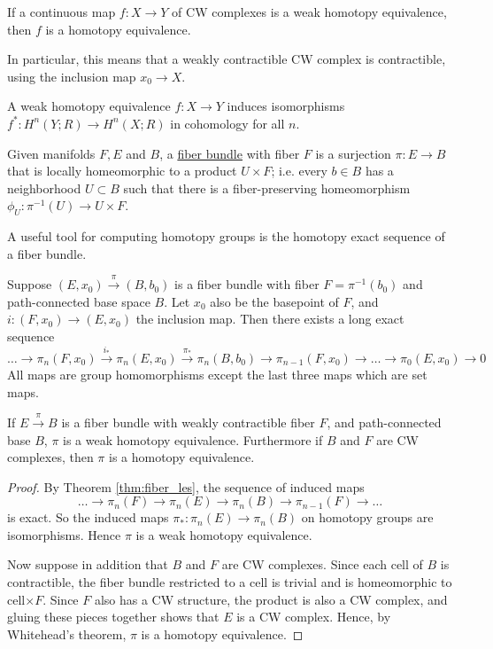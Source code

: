 \begin{thm} 
	If a continuous map $f:X\to Y$ of CW complexes 
	is a weak homotopy equivalence, then  $f$ is a homotopy equivalence. 
\end{thm}
In particular, this
means that a weakly contractible CW complex is contractible, using the inclusion
map $x_0 \to X$. 

\begin{thm} \label{thm:weak_to_cohomology}
	A weak homotopy equivalence $f:X\to Y$ induces isomorphisms
	$f^*:H^n(Y;R)\to H^n(X;R)$ in cohomology for all  $n$.
\end{thm}
\begin{defn}
	Given manifolds $F,E$ and $B$, 
	a \underline{fiber bundle} with fiber $F$ is a surjection  $\pi: E\to B$
	that is locally homeomorphic to a product $U\times F$; i.e. every  $b\in B$
	has a neighborhood  $U\subset B$ such that there is a fiber-preserving
	homeomorphism $\phi_U : \pi^{-1}(U) \to U\times F$.
\end{defn}
A useful tool for computing homotopy groups is the homotopy exact sequence of a
fiber bundle. 
\begin{thm} \label{thm:fiber_les}
	Suppose $(E,x_0) \xrightarrow{\pi} (B,b_0)$ is a fiber bundle with fiber
	$F=\pi^{-1}(b_0)$ and path-connected base space $B$. Let  $x_0$ also be the
	basepoint of $F$, and  $i:(F,x_0)\to (E,x_0)$ the inclusion map. Then there
	exists a long exact sequence
	\[
		\ldots\to\pi_n(F,x_0) \xrightarrow{i_*}\pi_n(E,x_0)
		\xrightarrow{\pi_*}\pi_n(B,b_0)
		\to \pi_{n-1}(F,x_0)\to\ldots\to\pi_0(E,x_0)\to 0
	\] 
	All maps are group homomorphisms except the last three maps which are set
	maps.
\end{thm}

\begin{prop} \label{prop:total_base_iso}
	If $E \xrightarrow{\pi} B$ is a fiber bundle with weakly contractible fiber $F$,
	and path-connected base $B$, $\pi$ is a weak homotopy equivalence.
	Furthermore if $B$ and $F$ are CW complexes, 
	then $\pi$ is a homotopy equivalence.  
\end{prop}
\begin{proof}
	By Theorem \ref{thm:fiber_les}, the sequence of induced maps
	\[
	\ldots \to \pi_n(F) \to \pi_n(E) \to\pi_n(B) \to
	\pi_{n-1}(F)\to \ldots
	\] 
	is exact. So the induced maps $\pi_* : \pi_n(E) \to
	\pi_n(B)$ on homotopy groups are isomorphisms. Hence $\pi$ is a weak
	homotopy equivalence. 

	Now suppose in addition that $B$ and $F$ are CW complexes. 
	Since each cell of $B$ is contractible, the fiber bundle
	restricted to a cell is trivial and is homeomorphic to  cell$\times F$. 
	Since  $F$ also has a CW structure, the product is also a CW complex, and
	gluing these pieces together shows that $E$ is a CW complex. Hence, by
	Whitehead's theorem,  $\pi$ is a homotopy equivalence. 
\end{proof}

